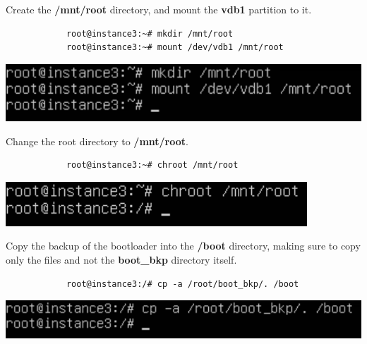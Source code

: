 \documentclass[letterpaper, 12pt]{article}
\begin{document}
\begin{enumerate}
    \begin{labstep}
        Create the \textbf{/mnt/root} directory, and mount the \textbf{vdb1} partition to it.
        \begin{lstlisting}
            root@instance3:~# mkdir /mnt/root
            root@instance3:~# mount /dev/vdb1 /mnt/root
        \end{lstlisting}

        \begin{center}
            \includegraphics[width=\linewidth]{images/part8/step11.png}
        \end{center}
    \end{labstep}

    \begin{labstep}
        Change the root directory to \textbf{/mnt/root}.
        \begin{lstlisting}
            root@instance3:~# chroot /mnt/root
        \end{lstlisting}

        \begin{center}
            \includegraphics[width=\linewidth]{images/part8/step12.png}
        \end{center}
    \end{labstep}

    \begin{labstep}
        Copy the backup of the bootloader into the \textbf{/boot} directory, making sure to copy only the files and not the \textbf{boot\_bkp} directory itself.
        \begin{lstlisting}
            root@instance3:/# cp -a /root/boot_bkp/. /boot
        \end{lstlisting}

        \begin{center}
            \includegraphics[width=\linewidth]{images/part8/step13.png}
        \end{center}
    \end{labstep}


\end{enumerate}
\end{document}
